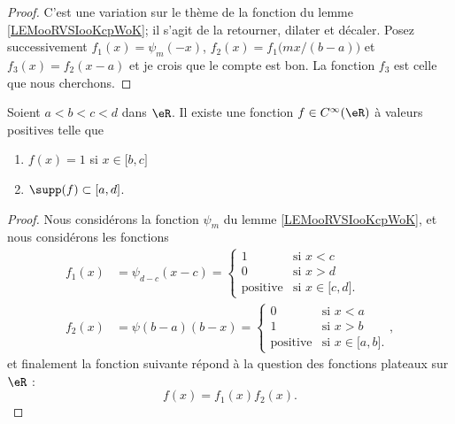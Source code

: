 \begin{proof}
	C'est une variation sur le thème de la fonction du lemme \ref{LEMooRVSIooKcpWoK}; il s'agit de la retourner, dilater et décaler. Posez successivement \( f_1(x)=\psi_m(-x)\), \( f_2(x)=f_1\big(mx/(b-a)\big)\) et \( f_3(x)=f_2(x-a)\) et je crois que le compte est bon. La fonction \( f_3\) est celle que nous cherchons.
\end{proof}

\begin{proposition}     \label{PROPooAZJZooTYWjzb}
	Soient \( a<b<c<d\) dans \( \eR\). Il existe une fonction \( f\in C^{\infty}(\eR)\) à valeurs positives telle que
	\begin{enumerate}
		\item
		      \( f(x)=1\) si \( x\in\mathopen[ b , c \mathclose]\)
		\item
		      \( \supp(f)\subset\mathopen[ a , d \mathclose]\).
	\end{enumerate}
\end{proposition}

\begin{proof}
	Nous considérons la fonction \( \psi_m\) du lemme \ref{LEMooRVSIooKcpWoK}, et nous considérons les fonctions
	\begin{subequations}
		\begin{align}
			f_1(x) & =\psi_{d-c}(x-c)=\begin{cases}
				                          1               & \text{si } x<c                               \\
				                          0               & \text{si } x>d                               \\
				                          \text{positive} & \text{si } x\in\mathopen[ c , d \mathclose].
			                          \end{cases} \\
			f_2(x) & =\psi(b-a)(b-x)=\begin{cases}
				                         0               & \text{si } x<a                                \\
				                         1               & \text{si } x>b                                \\
				                         \text{positive} & \text{si } x\in \mathopen[ a , b \mathclose].
			                         \end{cases},
		\end{align}
	\end{subequations}
	et finalement la fonction suivante répond à la question des fonctions plateaux sur \( \eR\) :
	\begin{equation}    \label{EqIHAFooXjfcll}
		f(x)=f_1(x)f_2(x).
	\end{equation}
\end{proof}




